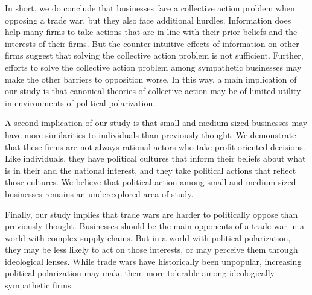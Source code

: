\documentclass{article}
\begin{document}
In short, we do conclude that businesses face a collective action problem when opposing a trade war, but they also face additional hurdles. Information does help many firms to take actions that are in line with their prior beliefs and the interests of their firms. But the counter-intuitive effects of information on other firms suggest that solving the collective action problem is not sufficient. Further, efforts to solve the collective action problem among sympathetic businesses may make the other barriers to opposition worse. In this way, a main implication of our study is that canonical theories of collective action may be of limited utility in environments of political polarization.

A second implication of our study is that small and medium-sized businesses may have more similarities to individuals than previously thought. We demonstrate that these firms are not always rational actors who take profit-oriented decisions. Like individuals, they have political cultures that inform their beliefs about what is in their and the national interest, and they take political actions that reflect those cultures. We believe that political action among small and medium-sized businesses remains an underexplored area of study.

Finally, our study implies that trade wars are harder to politically oppose than previously thought. Businesses should be the main opponents of a trade war in a world with complex supply chains. But in a world with political polarization, they may be less likely to act on those interests, or may perceive them through ideological lenses. While trade wars have historically been unpopular, increasing political polarization may make them more tolerable among ideologically sympathetic firms.

\newpage
 \setcounter{page}{1}




\newpage 



\end{document}
